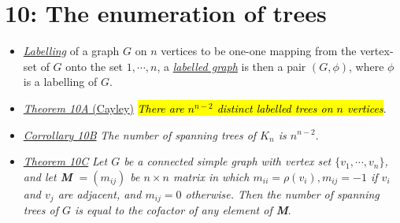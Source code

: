 \documentclass[12pt,a4paper, twocolumn]{article}
\begin{document}
\section*{10: The enumeration of trees}
\begin{itemize}
	\item \underline{\emph{\color{magenta} Labelling}} of a graph $G$ on $n$ vertices to be one-one mapping from the vertex-set of $G$ onto the set ${1, \cdots ,n}$, a \underline{\emph{\color{magenta} labelled graph}} is then a pair $(G, \phi)$, where $\phi$ is a labelling of $G$.
	\item \underline{\emph{\color{magenta}Theorem 10A} (Cayley)} \hl{\emph{There are $n^{n-2}$ distinct labelled trees on $n$ vertices}}.
	\item \underline{\emph{\color{magenta}Corrollary 10B}} \emph{The number of spanning trees of $K_n$ is $n^{n-2}$}.
	\item \underline{\emph{\color{magenta}Theorem 10C}} \emph{Let $G$ be a connected simple graph with vertex set $\{v_1,\cdots,v_n \}$, and let \textbf{M} $= (m_{ij})$ be $n \times n$ matrix in which $m_{ii} = \rho(v_i), m_{ij} = -1 $ if $v_i$ and $v_j$ are adjacent, and $m_{ij}=0$ otherwise. Then the number of spanning trees of $G$ is equal to the cofactor of any element of \textbf{M}}.	
\end{itemize}
\end{document}

